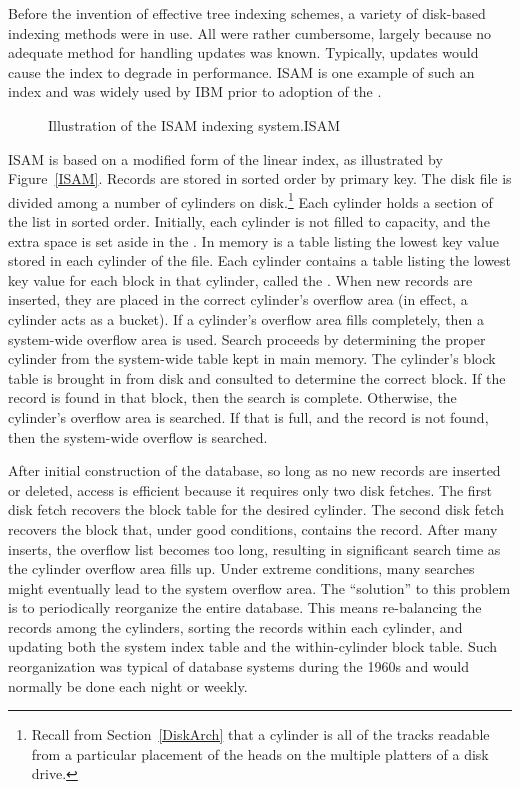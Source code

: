 Before the invention of effective tree indexing
schemes,  a variety of
disk-based indexing methods were in use.
All were rather cumbersome, largely because no adequate method for
handling updates was known.
Typically, updates would cause the index to degrade in performance.
ISAM is one example of such an index and was
widely used by IBM prior to adoption of the \Btree.

\begin{figure}
\vspace{-\bigskipamount}\vspace{-\bigskipamount}

{Illustration of the ISAM indexing system.}{ISAM}
\end{figure}

ISAM is based on a modified form of the linear index, as illustrated by
Figure~\ref{ISAM}.
Records are stored in sorted order by primary key.
The disk file is divided among a number of
cylinders on disk.\footnote{Recall from
Section~\ref{DiskArch} that a cylinder is all of the tracks readable
from a particular placement of the heads on the multiple platters of a
disk drive.}
Each cylinder holds a section of the list in sorted order.
Initially, each cylinder is not filled to capacity, and the extra
space is set aside in the .
In memory is a table listing the lowest key value stored in each
cylinder of the file.
Each cylinder contains a table listing the lowest key value for
each block in that cylinder, called the .
When new records are inserted, they are placed in the correct
cylinder's overflow area (in effect, a cylinder acts as a bucket).
If a cylinder's overflow area fills completely, then a system-wide
overflow area is used.
Search proceeds by determining the proper cylinder from the
system-wide table kept in main memory.
The cylinder's block table is brought in from disk and
consulted to determine the correct block.
If the record is found in that block, then the search is complete.
Otherwise, the cylinder's overflow area is searched.
If that is full, and the record is not found, then the system-wide
overflow is searched.

After initial construction of the database,
so long as no new records are inserted or deleted, access is
efficient because it requires only two disk fetches.
The first disk fetch recovers the block table for the desired
cylinder.
The second disk fetch recovers the block that, under good conditions,
contains the record.
After many inserts, the overflow list becomes too long, resulting in
significant search time as the cylinder overflow area fills up.
Under extreme conditions, many searches might eventually lead to the
system overflow area.
The ``solution'' to this problem is to periodically reorganize the
entire database.
This means re-balancing the records among the cylinders, sorting
the records within each cylinder, and updating both the system
index table and the within-cylinder block table.
Such reorganization was typical of database systems during the 1960s
and would normally be done each night or weekly.

